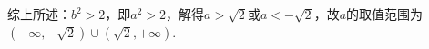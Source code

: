 \begin{question}[points=10]
\begin{solution}
综上所述：$b^{2}>2$，即$a^{2}>2$，解得$a>\sqrt{2}$或$a<-\sqrt{2}$，故$a$的取值范围为$(-\infty,-\sqrt{2})\cup(\sqrt{2},+\infty)$.
\end{solution}
\end{question}

